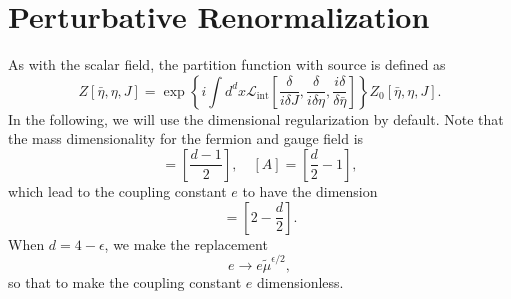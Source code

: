 \documentclass[aps,prb,superscriptaddress,nofootinbib]{revtex4}
\begin{document}
\section{Perturbative Renormalization}
As with the scalar field, the partition function with source is defined as
\begin{equation}
	Z[\bar\eta,\eta,J] = \exp\left\{i\int d^dx \mathcal{L}_{\mathrm{int}}\left[\frac{\delta}{i\delta J},\frac{\delta}{i\delta \eta},\frac{i\delta}{\delta \bar\eta}\right]\right\} Z_0[\bar\eta,\eta,J].
\end{equation}
In the following, we will use the dimensional regularization by default. 
Note that the mass dimensionality for the fermion and gauge field is
\begin{equation*}
	[\psi] = \left[\frac{d-1}{2}\right],\quad
	[A] = \left[\frac{d}{2}-1\right],
\end{equation*}
which lead to the coupling constant $e$ to have the dimension
\begin{equation*}
	[e] = \left[2-\frac{d}{2} \right].
\end{equation*}
When $d=4-\epsilon$, we make the replacement
\begin{equation*}
	e \rightarrow e \tilde{\mu}^{\epsilon/2},
\end{equation*}
so that to make the coupling constant $e$ dimensionless.
\end{document}
